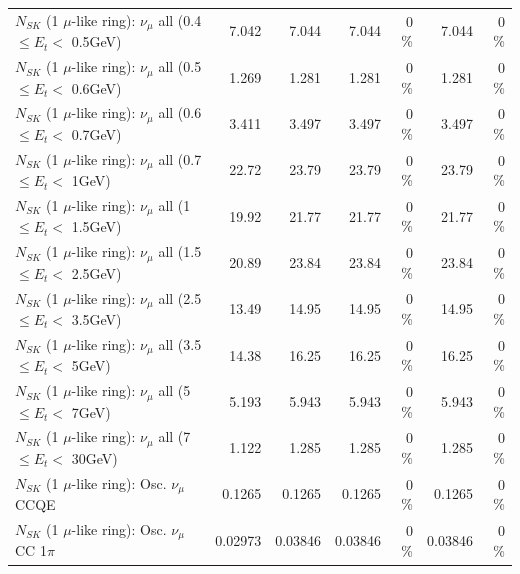\begin{table}
\begin{tabular}{| l | r | r | r  r | r  r |}
       $N_{SK}$ (1 $\mu$-like ring): $\nu_{\mu}$ all (0.4 $\leq E_{t} <$ 0.5GeV) &           7.042 &           7.044 &           7.044 &        0 \%  &           7.044 &        0 \%  \\ 
       $N_{SK}$ (1 $\mu$-like ring): $\nu_{\mu}$ all (0.5 $\leq E_{t} <$ 0.6GeV) &           1.269 &           1.281 &           1.281 &        0 \%  &           1.281 &        0 \%  \\ 
       $N_{SK}$ (1 $\mu$-like ring): $\nu_{\mu}$ all (0.6 $\leq E_{t} <$ 0.7GeV) &           3.411 &           3.497 &           3.497 &        0 \%  &           3.497 &        0 \%  \\ 
         $N_{SK}$ (1 $\mu$-like ring): $\nu_{\mu}$ all (0.7 $\leq E_{t} <$ 1GeV) &           22.72 &           23.79 &           23.79 &        0 \%  &           23.79 &        0 \%  \\ 
         $N_{SK}$ (1 $\mu$-like ring): $\nu_{\mu}$ all (1 $\leq E_{t} <$ 1.5GeV) &           19.92 &           21.77 &           21.77 &        0 \%  &           21.77 &        0 \%  \\ 
       $N_{SK}$ (1 $\mu$-like ring): $\nu_{\mu}$ all (1.5 $\leq E_{t} <$ 2.5GeV) &           20.89 &           23.84 &           23.84 &        0 \%  &           23.84 &        0 \%  \\ 
       $N_{SK}$ (1 $\mu$-like ring): $\nu_{\mu}$ all (2.5 $\leq E_{t} <$ 3.5GeV) &           13.49 &           14.95 &           14.95 &        0 \%  &           14.95 &        0 \%  \\ 
         $N_{SK}$ (1 $\mu$-like ring): $\nu_{\mu}$ all (3.5 $\leq E_{t} <$ 5GeV) &           14.38 &           16.25 &           16.25 &        0 \%  &           16.25 &        0 \%  \\ 
           $N_{SK}$ (1 $\mu$-like ring): $\nu_{\mu}$ all (5 $\leq E_{t} <$ 7GeV) &           5.193 &           5.943 &           5.943 &        0 \%  &           5.943 &        0 \%  \\ 
          $N_{SK}$ (1 $\mu$-like ring): $\nu_{\mu}$ all (7 $\leq E_{t} <$ 30GeV) &           1.122 &           1.285 &           1.285 &        0 \%  &           1.285 &        0 \%  \\ 
\hline
\hline
                               $N_{SK}$ (1 $\mu$-like ring): Osc. $\nu_\mu$ CCQE &          0.1265 &          0.1265 &          0.1265 &        0 \%  &          0.1265 &        0 \%  \\ 
                          $N_{SK}$ (1 $\mu$-like ring): Osc. $\nu_\mu$ CC 1$\pi$ &         0.02973 &         0.03846 &         0.03846 &        0 \%  &         0.03846 &        0 \%  \\ 

\end{tabular}
\end{table}
